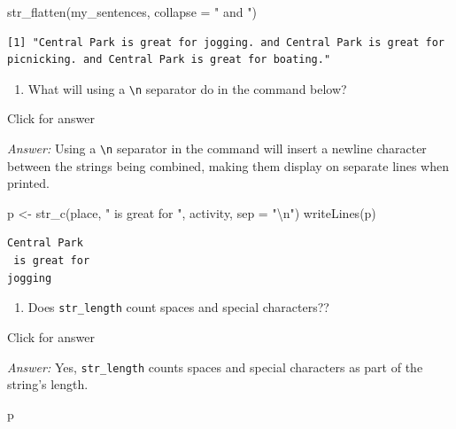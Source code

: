 \documentclass[
]{book}
\newenvironment{Shaded}{\begin{snugshade}}{\end{snugshade}}
\newcommand{\AttributeTok}[1]{\textcolor[rgb]{0.77,0.63,0.00}{#1}}
\newcommand{\FunctionTok}[1]{\textcolor[rgb]{0.00,0.00,0.00}{#1}}
\newcommand{\NormalTok}[1]{#1}
\newcommand{\OtherTok}[1]{\textcolor[rgb]{0.56,0.35,0.01}{#1}}
\newcommand{\SpecialCharTok}[1]{\textcolor[rgb]{0.00,0.00,0.00}{#1}}
\newcommand{\StringTok}[1]{\textcolor[rgb]{0.31,0.60,0.02}{#1}}
\providecommand{\tightlist}{%
  \setlength{\itemsep}{0pt}\setlength{\parskip}{0pt}}
\begin{document}
\begin{Shaded}
\begin{Highlighting}[]
\FunctionTok{str\_flatten}\NormalTok{(my\_sentences, }\AttributeTok{collapse =} \StringTok{" and "}\NormalTok{)}
\end{Highlighting}
\end{Shaded}

\begin{verbatim}
[1] "Central Park is great for jogging. and Central Park is great for picnicking. and Central Park is great for boating."
\end{verbatim}

\begin{enumerate}
\def\labelenumi{\alph{enumi}.}
\setcounter{enumi}{3}
\tightlist
\item
  What will using a \texttt{\textbackslash{}n} separator do in the command below?
\end{enumerate}

Click for answer

\emph{Answer:} Using a \texttt{\textbackslash{}n} separator in the command will insert a newline character between the strings being combined, making them display on separate lines when printed.

\begin{Shaded}
\begin{Highlighting}[]
\NormalTok{p }\OtherTok{\textless{}{-}} \FunctionTok{str\_c}\NormalTok{(place, }\StringTok{" is great for "}\NormalTok{, activity, }\AttributeTok{sep =} \StringTok{"}\SpecialCharTok{\textbackslash{}n}\StringTok{"}\NormalTok{)}
\FunctionTok{writeLines}\NormalTok{(p)}
\end{Highlighting}
\end{Shaded}

\begin{verbatim}
Central Park
 is great for 
jogging
\end{verbatim}

\begin{enumerate}
\def\labelenumi{\alph{enumi}.}
\setcounter{enumi}{4}
\tightlist
\item
  Does \texttt{str\_length} count spaces and special characters??
\end{enumerate}

Click for answer

\emph{Answer:} Yes, \texttt{str\_length} counts spaces and special characters as part of the string's length.

\begin{Shaded}
\begin{Highlighting}[]
\NormalTok{p}
\end{Highlighting}
\end{Shaded}
\end{document}
